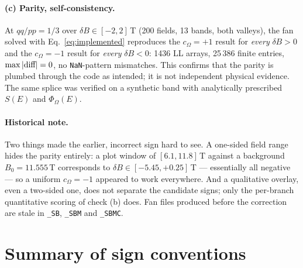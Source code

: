 \documentclass[11pt]{article}
\newcommand{\Om}{\Omega}
\newcommand{\Bfield}{B}
\newcommand{\Phib}{\Phi_{\!\Om}}
\newcommand{\code}[1]{\texttt{#1}}
\begin{document}
\paragraph{(c) Parity, self-consistency.}
At $qq/pp = 1/3$ over $\delta\Bfield \in [-2,2]\,$T (200 fields, 13
bands, both valleys), the fan solved with Eq.~\eqref{eq:implemented}
reproduces the $c_\Om = +1$ result for \emph{every} $\delta\Bfield > 0$
and the $c_\Om = -1$ result for \emph{every} $\delta\Bfield < 0$: 1436 LL
arrays, 25\,386 finite entries, $\max\abs{\text{diff}} = 0$, no
\code{NaN}-pattern mismatches.  This confirms that the parity is plumbed
through the code as intended; it is not independent physical evidence.
The same splice was verified on a synthetic band with analytically
prescribed $S(E)$ and $\Phib(E)$.

\paragraph{Historical note.}
Two things made the earlier, incorrect sign hard to see.  A one-sided
field range hides the parity entirely: a plot window of
$[6.1, 11.8]\,$T against a background $\Bfield_0 = 11.555\,$T
corresponds to $\delta\Bfield \in [-5.45, +0.25]\,$T --- essentially
all negative --- so a uniform $c_\Om = -1$ appeared to work everywhere.
And a qualitative overlay, even a two-sided one, does not separate the
candidate signs; only the per-branch quantitative scoring of check (b)
does.  Fan files produced before the correction are stale in \code{\_SB},
\code{\_SBM} and \code{\_SBMC}.

\section{Summary of sign conventions}\label{sec:signs}
\end{document}

